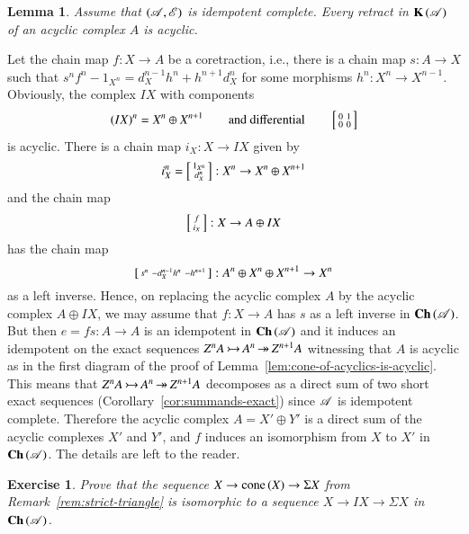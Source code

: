 \documentclass[1p]{elsarticle}
\makeatletter
\renewenvironment{proof}[1][\proofname]{\par
  \pushQED{\qed}%
  \normalfont \topsep6\p@\@plus6\p@\relax
  \trivlist
  \item[\hskip\labelsep
        \scshape
    #1\@addpunct{.}]\ignorespaces
}{%
  \popQED\endtrivlist\@endpefalse
}
\theoremstyle{mythm}
\newtheorem{Lem}[Thm]{Lemma}
\theoremstyle{mydef}
\newtheorem{Exer}[Thm]{Exercise}
\makeatother
\begin{document}
\begin{Lem}
  \label{lem:acyclic-complexes-thick}
  Assume that $(\operatorname{\mathscr{A}},\operatorname{\mathscr{E}})$ is idempotent complete. Every retract
  in $\operatorname{\mathbf{K}}{(\operatorname{\mathscr{A}})}$ of an acyclic complex $A$ is acyclic.
\end{Lem}
\begin{proof}[Proof (cf. {\cite[2.3 a)]{MR1052551}})]
  Let the chain map $f: X \to A$ be a coretraction, i.e., 
  there is a chain map $s: A \to X$ such that 
  $s^{n}f^{n} - 1_{X^{n}} = d_{X}^{n-1}h^{n} + h^{n+1}d_{X}^{n}$ for
  some morphisms $h^{n}: X^{n} \to X^{n-1}$. Obviously, the complex
  $IX$ with components
  \[
  (IX)^{n} = X^{n} \oplus X^{n+1} \qquad \text{and differential}
  \qquad
  \left[\begin{smallmatrix} 0 & 1 \\ 0 & 0 \end{smallmatrix}\right]
  \]
  is acyclic. There is a chain map $i_{X}: X \to IX$ given by
  \[
  i_{X}^{n} = \left[\begin{smallmatrix} 1_{X^{n}} \\ d_{X}^{n} \end{smallmatrix}\right]:
  X^{n} \to X^{n} \oplus X^{n+1}
  \]
  and the chain map
  \[
  \left[\begin{smallmatrix} f \\ i_{X} \end{smallmatrix}\right] : X \to A \oplus IX
  \]
  has the chain map
  \[
  \left[\begin{smallmatrix} s^{n} & -d_{X}^{n-1}h^{n} & -h^{n+1} \end{smallmatrix}\right]: 
  A^{n} \oplus X^{n} \oplus X^{n+1} \to X^{n}
  \]
  as a left inverse. Hence, on replacing the acyclic complex $A$ by the
  acyclic complex $A \oplus IX$, we may assume that $f: X \to A$ has
  $s$ as a left inverse in $\operatorname{\mathbf{Ch}}{(\operatorname{\mathscr{A}})}$. But then $e = fs: A \to A$ is
  an idempotent in $\operatorname{\mathbf{Ch}}{(\operatorname{\mathscr{A}})}$ 
  and it induces an idempotent on the exact sequences
  $Z^{n}A \operatorname{\rightarrowtail} A^{n} \operatorname{\twoheadrightarrow} Z^{n+1}A$ witnessing that $A$ is acyclic
  as in the first diagram of the proof of 
  Lemma~\ref{lem:cone-of-acyclics-is-acyclic}. This means that
  $Z^{n}A \operatorname{\rightarrowtail} A^{n} \operatorname{\twoheadrightarrow} Z^{n+1}A$ decomposes as a direct sum of
  two short exact sequences (Corollary~\ref{cor:summands-exact}) since
  $\operatorname{\mathscr{A}}$ is idempotent complete. Therefore the acyclic complex
  $A = X' \oplus Y'$ is a direct sum of the acyclic complexes $X'$ and
  $Y'$, and $f$ induces an isomorphism from $X$ to $X'$ in
  $\operatorname{\mathbf{Ch}}{(\operatorname{\mathscr{A}})}$. The details are left to the reader.
\end{proof}

\begin{Exer}
  \label{exer:comparing-dist-triangles}
  Prove that the sequence $X \to \operatorname{cone}{(X)} \to \Sigma X$ from
  Remark~\ref{rem:strict-triangle} is
  isomorphic to a sequence $X \to IX \to \Sigma X$ in
  $\operatorname{\mathbf{Ch}}{(\operatorname{\mathscr{A}})}$. 
\end{Exer}
\end{document}
